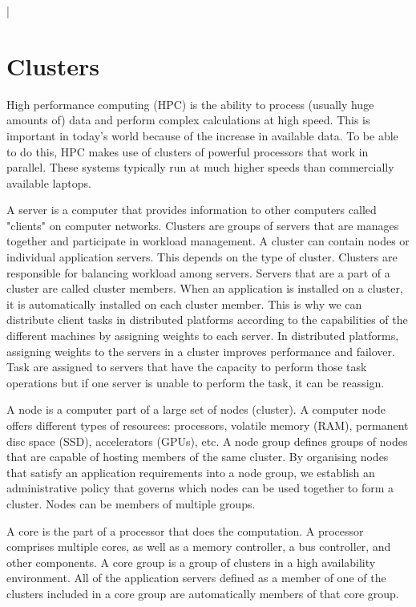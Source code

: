 \documentclass[11pt]{article}
\begin{document}
\lstset{frameround=fttt,language=Matlab}

\lstMakeShortInline[columns=fixed]|


\section{Clusters}

High performance computing (HPC) is the ability to process (usually huge amounts of) data and perform complex calculations at high speed. This is important in today's world because of the increase in available data. To be able to do this, HPC makes use of clusters of powerful processors that work in parallel. These systems typically run at much higher speeds than commercially available laptops. 

A server is a computer that provides information to other computers called "clients" on computer networks. Clusters are groups of servers that are manages together and participate in workload management. A cluster can contain nodes or individual application servers. This depends on the type of cluster. Clusters are responsible for balancing workload among servers. Servers that are a part of a cluster are called cluster members. When an application is installed on a cluster, it is automatically installed on each cluster member. This is why we can distribute client tasks in distributed platforms according to the capabilities of the different machines by assigning weights to each server. In distributed platforms, assigning weights to the servers in a cluster improves performance and failover. Task are assigned to servers that have the capacity to perform those task operations but if one server is unable to perform the task, it can be reassign. 

A node is a computer part of a large set of nodes (cluster). A computer node offers different types of resources: processors, volatile memory (RAM), permanent disc space (SSD), accelerators (GPUs), etc. A node group defines groups of nodes that are capable of hosting members of the same cluster. By organising nodes that satisfy an application requirements into a node group, we establish an administrative policy that governs which nodes can be used together to form a cluster. Nodes can be members of multiple groups. 

A core is the part of a processor that does the computation. A processor comprises multiple cores, as well as a memory controller, a bus controller, and other components. A core group is a group of clusters in a high availability environment. All of the application servers defined as a member of one of the clusters included in a core group are automatically members of that core group. 
\end{document}
